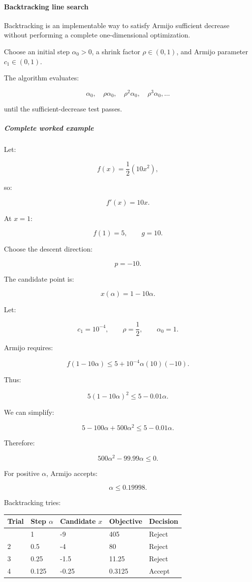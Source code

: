 \paragraph{Backtracking line search}\label{backtracking-line-search}

Backtracking is an implementable way to satisfy Armijo sufficient decrease without performing a complete one-dimensional optimization.

Choose an initial step \(\alpha_0>0\), a shrink factor \(\rho\in(0,1)\), and Armijo parameter \(c_1\in(0,1)\).

The algorithm evaluates:

\[
\alpha_0,\quad \rho\alpha_0,\quad \rho^2\alpha_0,\quad \rho^3\alpha_0,\ldots
\]

until the sufficient-decrease test passes.

\subparagraph{Complete worked example}\label{complete-worked-example}

Let:

\[
f(x)=\frac12(10x^2),
\]

so:

\[
f'(x)=10x.
\]

At \(x=1\):

\[
f(1)=5,\qquad g=10.
\]

Choose the descent direction:

\[
p=-10.
\]

The candidate point is:

\[
x(\alpha)=1-10\alpha.
\]

Let:

\[
c_1=10^{-4},\qquad\rho=\frac12,\qquad\alpha_0=1.
\]

Armijo requires:

\[
f(1-10\alpha) \le 5+10^{-4}\alpha(10)(-10).
\]

Thus:

\[
5(1-10\alpha)^2\le5-0.01\alpha.
\]

We can simplify:

\[
5-100\alpha+500\alpha^2 \le5-0.01\alpha.
\]

Therefore:

\[
500\alpha^2-99.99\alpha\le0.
\]

For positive \(\alpha\), Armijo accepts:

\[
\boxed{\alpha\le0.19998}.
\]

Backtracking tries:

{\def\LTcaptype{none} %
\begin{longtable}[]{@{}lllll@{}}
\toprule\noalign{}
Trial & Step \(\alpha\) & Candidate \(x\) & Objective & Decision \\
\midrule\noalign{}
\endhead
\bottomrule\noalign{}
\endlastfoot
1 & 1 & -9 & 405 & Reject \\
2 & 0.5 & -4 & 80 & Reject \\
3 & 0.25 & -1.5 & 11.25 & Reject \\
4 & 0.125 & -0.25 & 0.3125 & Accept \\
\end{longtable}
}

